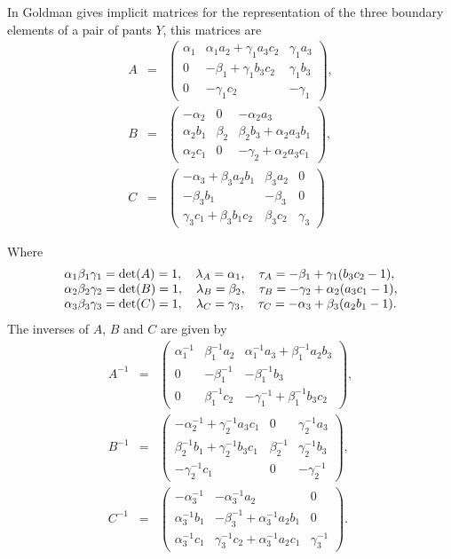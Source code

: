 \documentclass[11pt]{amsart}
\numberwithin{equation}{section}
\begin{document}
In \cite{Gol} Goldman gives implicit matrices for the representation of the three boundary elements of a pair of pants 
$Y$, this matrices are
\begin{eqnarray*}
A & = & \left(\begin{matrix}
\alpha_1 & \alpha_1a_2+\gamma_1a_3c_2 & \gamma_1a_3 \\
0 & -\beta_1+\gamma_1b_3c_2 & \gamma_1b_3 \\
0 & -\gamma_1c_2 & -\gamma_1 \end{matrix}\right), \\
B & = & \left(\begin{matrix}
-\alpha_2 & 0 & -\alpha_2a_3 \\
\alpha_2b_1 & \beta_2 & \beta_2b_3+\alpha_2a_3b_1 \\
\alpha_2c_1 & 0 & -\gamma_2+\alpha_2a_3c_1 \end{matrix}\right),\\
C & = & \left(\begin{matrix}
-\alpha_3+\beta_3a_2b_1 & \beta_3a_2 & 0 \\
-\beta_3b_1 & -\beta_3 & 0 \\
\gamma_3c_1+\beta_3b_1c_2 & \beta_3c_2 & \gamma_3 \end{matrix}\right) 
\end{eqnarray*}

Where
$$ 
\begin{array}{lll}
\alpha_1\beta_1\gamma_1={\rm det}(A)=1,\quad
\lambda_A=\alpha_1,\quad \tau_A=-\beta_1+\gamma_1(b_3c_2-1), \\
\alpha_2\beta_2\gamma_2={\rm det}(B)=1,\quad
\lambda_B=\beta_2,\quad \tau_B=-\gamma_2+\alpha_2(a_3c_1-1), \\
\alpha_3\beta_3\gamma_3={\rm det}(C)=1,\quad
\lambda_C=\gamma_3,\quad \tau_C=-\alpha_3+\beta_3(a_2b_1-1).
\end{array}
$$
The inverses of $A$, $B$ and $C$ are given by
\begin{eqnarray*}
A^{-1} & = & \left(\begin{matrix}
\alpha_1^{-1} & \beta_1^{-1}a_2 & \alpha_1^{-1}a_3+\beta_1^{-1}a_2b_3 \\
0 & -\beta_1^{-1} & -\beta_1^{-1}b_3 \\
0 & \beta_1^{-1}c_2 & -\gamma_1^{-1}+\beta_1^{-1}b_3c_2 
\end{matrix}\right), \\
B^{-1} & = & \left(\begin{matrix}
-\alpha_2^{-1}+\gamma_2^{-1}a_3c_1 & 0 & \gamma_2^{-1}a_3 \\
\beta_2^{-1}b_1+\gamma_2^{-1}b_3c_1 & \beta_2^{-1} & \gamma_2^{-1}b_3 \\
-\gamma_2^{-1}c_1 & 0 & -\gamma_2^{-1}
\end{matrix}\right), \\
C^{-1} & = & \left(\begin{matrix}
-\alpha_3^{-1} & -\alpha_3^{-1}a_2 & 0 \\
\alpha_3^{-1}b_1 & -\beta_3^{-1}+\alpha_3^{-1}a_2b_1 & 0 \\
\alpha_3^{-1}c_1 & \gamma_3^{-1}c_2+\alpha_3^{-1}a_2c_1 & \gamma_3^{-1}
\end{matrix}\right).
\end{eqnarray*}
\end{document}
